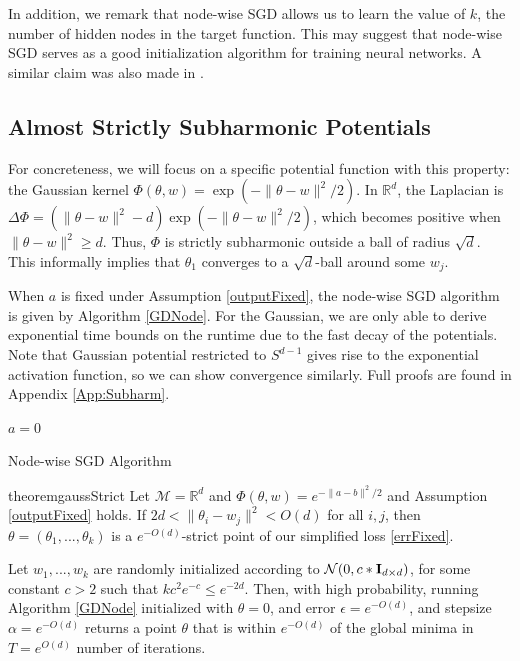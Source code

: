 \documentclass[11pt]{article}
\newcommand{\N}{{\mathbb{N}}}
\newcommand{\R}{{\mathbb{R}}}
\begin{document}
In addition, we remark that node-wise SGD allows us to learn the value of $k$, the number of hidden nodes in the target function. This may suggest that node-wise SGD serves as a good initialization algorithm for training neural networks. A similar claim was also made in \cite{WuM16}.


\subsection{Almost Strictly Subharmonic Potentials}

For concreteness, we will focus on a specific potential function with this property: the Gaussian kernel $\Phi(\theta, w) = \exp(-\|\theta - w\|^2/2)$. In $\R^d$, the Laplacian is $\Delta \Phi = ( \|\theta - w\|^2 -d ) \exp(-\|\theta - w\|^2/2)$, which becomes positive when $\|\theta - w \|^2 \geq d$. Thus, $\Phi$ is strictly subharmonic outside a ball of radius $\sqrt{d}$. This informally implies that $\theta_1$ converges to a $\sqrt{d}$-ball around some $w_j$. 

When $a$ is fixed under Assumption \ref{outputFixed}, the node-wise SGD algorithm is given by Algorithm \ref{GDNode}. For the Gaussian, we are only able to derive exponential time bounds on the runtime due to the fast decay of the potentials. Note that Gaussian potential restricted to $S^{d-1}$ gives rise to the exponential activation function, so we can show convergence similarly. Full proofs are found in Appendix \ref{App:Subharm}.


\begin{algorithm}[h]
\SetAlgoLined
\KwIn{$\theta = (\theta_1,...,\theta_k), \theta_i \in \mathcal{M}$; $T\in \N$; $\widehat{L}$; $\alpha\in \R$; $\epsilon \in \R$}


 $a = 0$\;
  
 \caption{Node-wise SGD Algorithm}
 \label{GDNode}
\end{algorithm}





\begin{restatable}{theorem}{gaussStrict}
\label{GaussStrict}
Let $\mathcal{M} = \R^d$ and $\Phi(\theta,w) = e^{-\|a-b\|^2/2}$ and Assumption \ref{outputFixed} holds. If $2d < \|\theta_i - w_j\|^2 < O(d)$ for all $i, j$, then $\theta = (\theta_1,...,\theta_k)$ is a $e^{-O(d)}$-strict point of our simplified loss \eqref{errFixed}.

Let $w_1,...,w_k$ are randomly initialized according to $\mathcal{N}(0, c*{\bf I}_{d\times d})$, for some constant $c > 2$ such that $kc^2e^{-c} \leq e^{-2d}$. Then, with high probability, running Algorithm \ref{GDNode} initialized with $\theta = 0$, and error  $\epsilon = e^{-O(d)}$, and stepsize $\alpha = e^{-O(d)}$ returns a point $\theta$ that is within $e^{-O(d)}$ of the global minima in $T = e^{O(d)}$ number of iterations.

\end{restatable}
\end{document}
